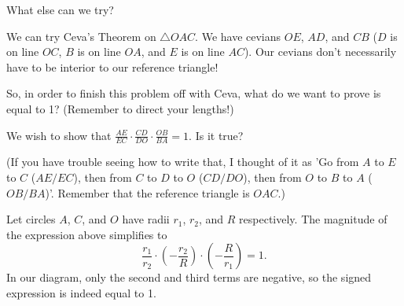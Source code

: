 What else can we try?


We can try Ceva's Theorem on $\triangle OAC$. We have cevians $OE$, $AD$, and $CB$ ($D$ is on line $OC$, $B$ is on line $OA$, and $E$ is on line $AC$). Our cevians don't necessarily have to be interior to our reference triangle!

So, in order to finish this problem off with Ceva, what do we want to prove is equal to 1? (Remember to direct your lengths!)






We wish to show that $\frac{AE}{EC}\cdot\frac{CD}{DO}\cdot\frac{OB}{BA} = 1$. Is it true?

(If you have trouble seeing how to write that, I thought of it as 'Go from $A$ to $E$ to $C$ ($AE/EC$), then from $C$ to $D$ to $O$ ($CD/DO$), then from $O$ to $B$ to $A$ ($OB/BA$)'.  Remember that the reference triangle is $OAC$.)


Let circles $A$, $C$, and $O$ have radii $r_1$, $r_2$, and $R$ respectively. The magnitude of the expression above simplifies to $$ \frac{r_1}{r_2}\cdot \left(-\frac{r_2}{R}\right)\cdot\left(-\frac{R}{r_1}\right) = 1. $$ In our diagram, only the second and third terms are negative, so the signed expression is indeed equal to 1.

